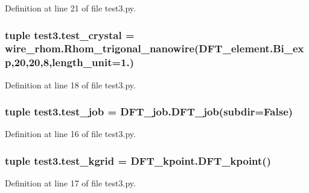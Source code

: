 Definition at line 21 of file test3.\+py.

\hypertarget{namespacetest3_abb0fd19d3a9690b2ad72da60814ee612}{
\subsubsection[{test\+\_\+crystal}]{\setlength{\rightskip}{0pt plus 5cm}tuple test3.\+test\+\_\+crystal = wire\+\_\+rhom.\+Rhom\+\_\+trigonal\+\_\+nanowire(D\+F\+T\+\_\+element.\+Bi\+\_\+exp,20,20,8,length\+\_\+unit=1.)}}\label{namespacetest3_abb0fd19d3a9690b2ad72da60814ee612}


Definition at line 18 of file test3.\+py.

\hypertarget{namespacetest3_a0d36fc96483a4543e1473d3c1253346e}{
\subsubsection[{test\+\_\+job}]{\setlength{\rightskip}{0pt plus 5cm}tuple test3.\+test\+\_\+job = D\+F\+T\+\_\+job.\+D\+F\+T\+\_\+job(subdir=False)}}\label{namespacetest3_a0d36fc96483a4543e1473d3c1253346e}


Definition at line 16 of file test3.\+py.

\hypertarget{namespacetest3_a317c841e10b9ca6fc53f8af033d8070d}{
\subsubsection[{test\+\_\+kgrid}]{\setlength{\rightskip}{0pt plus 5cm}tuple test3.\+test\+\_\+kgrid = D\+F\+T\+\_\+kpoint.\+D\+F\+T\+\_\+kpoint()}}\label{namespacetest3_a317c841e10b9ca6fc53f8af033d8070d}


Definition at line 17 of file test3.\+py.

